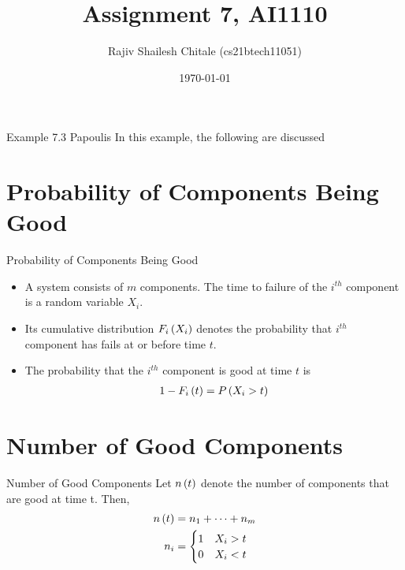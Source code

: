 \documentclass{beamer}
\begin{document}
\let\StandardTheFigure\thefigure
\let\vec\mathbf

\def\putbox#1#2#3{\makebox[0in][l]{\makebox[#1][l]{}\raisebox{\baselineskip}[0in][0in]{\raisebox{#2}[0in][0in]{#3}}}}
     \def\rightbox#1{\makebox[0in][r]{#1}}
     \def\centbox#1{\makebox[0in]{#1}}
     \def\topbox#1{\raisebox{-\baselineskip}[0in][0in]{#1}}
     \def\midbox#1{\raisebox{-0.5\baselineskip}[0in][0in]{#1}}
\vspace{3cm}


\title{Assignment 7, AI1110} 
\author{Rajiv Shailesh Chitale (cs21btech11051)}
\date{\today}
\logo{\large \LaTeX{}}
\begin{frame}
    \titlepage 
\end{frame}
%
\logo{}
%
\begin{frame}{Example 7.3 Papoulis}
    In this example, the following are discussed
    \tableofcontents
\end{frame}
%
\section{Probability of Components Being Good}
\begin{frame}{Probability of Components Being Good}
    \begin{itemize}
        \item A system consists of $m$ components. The time to failure of the $i^{th}$ component is a random variable $X_i$.
        \item Its cumulative distribution $F_i\left(X_i\right)$ denotes the probability that $i^{th}$ component has fails at or before time $t$. 
        \item The probability that the $i^{th}$ component is good at time $t$ is 
        \begin{align}
            1 - F_i\left(t\right) = P\left(X_i > t\right) 
        \end{align}
    \end{itemize}
\end{frame}
%
\section{Number of Good Components}
\begin{frame}{Number of Good Components}
    Let $n\left(t\right)$ denote the number
    of components that are good at time t. Then,
    \begin{align}
        n\left(t\right) &= n_1 + \dots + n_m \\
        n_i &=
        \begin{cases} 
        1 & X_i > t \\
        0 & X_i < t
        \end{cases}
    \end{align} 
\end{frame}
%
\end{document}
